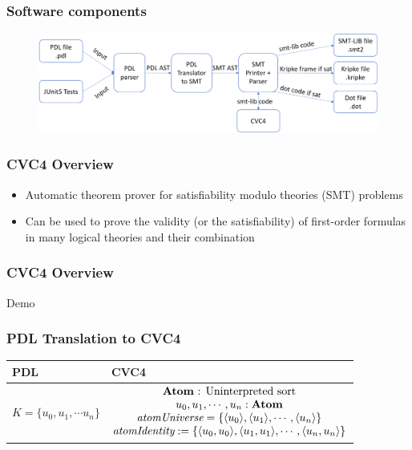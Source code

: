 \documentclass{beamer}
\begin{document}
\begin{frame}
\frametitle{Software components}
\begin{figure}
 \centering
 \includegraphics[scale=.25,keepaspectratio=true]{./solver.png}
\end{figure}
\end{frame}



\begin{frame}
\frametitle{CVC4 Overview}

\begin{itemize}
\item Automatic theorem prover for satisfiability modulo theories (SMT) problems
 \vfill 
\item Can be used to prove the validity (or the satisfiability) of first-order formulas in many logical theories and their combination

\end{itemize}
\end{frame}

\begin{frame}[fragile]
\frametitle{CVC4 Overview}
\huge
\centering

Demo

\end{frame}



\begin{frame}[fragile]
\frametitle{PDL Translation to CVC4}
\begin{tabular}{ll} 
\toprule
PDL & CVC4 \\    
\midrule    
$K=\lbrace u_0, u_1, \cdots u_n \rbrace$ &  
$\begin{matrix}
\text{\textbf{Atom} : \text{Uninterpreted sort}} \\
u_0, u_1, \cdots, u_n: \textbf{Atom} \\
\textit{atomUniverse} = \lbrace \langle u_0 \rangle, \langle u_1 \rangle, \cdots , \langle u_n \rangle \rbrace \\
\textit{atomIdentity}:  = \lbrace \langle u_0, u_0 \rangle, \langle u_1, u_1 \rangle, \cdots , \langle u_n, u_n \rangle \rbrace \\
\end{matrix}$ \\ \bottomrule
\end{tabular}
\end{frame} 
\end{document}
